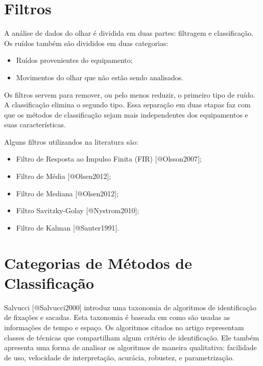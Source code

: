 \section{Filtros}\label{filtros}

A análise de dados do olhar é dividida em duas partes: filtragem e
classificação. Os ruídos também são divididos em duas categorias:

\begin{itemize}
\itemsep1pt\parskip0pt
\item
  Ruídos provenientes do equipamento;
\item
  Movimentos do olhar que não estão sendo analisados.
\end{itemize}

Os filtros servem para remover, ou pelo menos reduzir, o primeiro tipo
de ruído. A classificação elimina o segundo tipo. Essa separação em duas
etapas faz com que os métodos de classificação sejam mais independentes
dos equipamentos e suas características.

Alguns filtros utilizandos na literatura são:

\begin{itemize}
\itemsep1pt\parskip0pt
\item
  Filtro de Resposta ao Impulso Finita (FIR) {[}@Olsson2007{]};
\item
  Filtro de Média {[}@Olsen2012{]};
\item
  Filtro de Mediana {[}@Olsen2012{]};
\item
  Filtro Savitzky-Golay {[}@Nystrom2010{]};
\item
  Filtro de Kalman {[}@Sauter1991{]}.
\end{itemize}

\section{Categorias de Métodos de
Classificação}\label{categorias-de-muxe9todos-de-classificauxe7uxe3o}

Salvucci {[}@Salvucci2000{]} introduz uma taxonomia de algoritmos de
identificação de fixações e sacadas. Esta taxonomia é baseada em como
são usadas as informações de tempo e espaço. Os algoritmos citados no
artigo representam classes de técnicas que compartilham algum critério
de identificação. Ele também apresenta uma forma de analisar os
algoritmos de maneira qualitativa: facilidade de uso, velocidade de
interpretação, acurácia, robustez, e parametrização.

